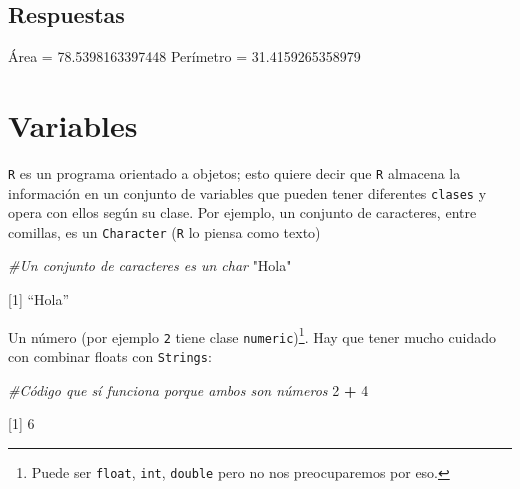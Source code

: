 \documentclass[
]{book}
\newenvironment{Shaded}{\begin{snugshade}}{\end{snugshade}}
\newcommand{\CommentTok}[1]{\textcolor[rgb]{0.56,0.35,0.01}{\textit{#1}}}
\newcommand{\DecValTok}[1]{\textcolor[rgb]{0.00,0.00,0.81}{#1}}
\newcommand{\OperatorTok}[1]{\textcolor[rgb]{0.81,0.36,0.00}{\textbf{#1}}}
\newcommand{\StringTok}[1]{\textcolor[rgb]{0.31,0.60,0.02}{#1}}
\begin{document}
\hypertarget{respuestas}{%
\subsection{Respuestas}\label{respuestas}}

Área = 78.5398163397448
Perímetro = 31.4159265358979

\hypertarget{variables}{%
\section{Variables}\label{variables}}

\texttt{R} es un programa orientado a objetos; esto quiere decir que \texttt{R} almacena la información en un conjunto de variables que pueden tener diferentes \texttt{clases} y opera con ellos según su clase. Por ejemplo, un conjunto de caracteres, entre comillas, es un \texttt{Character} (\texttt{R} lo piensa como texto)

\begin{Shaded}
\begin{Highlighting}[]
\CommentTok{#Un conjunto de caracteres es un char}
\StringTok{"Hola"}
\end{Highlighting}
\end{Shaded}

{[}1{]} ``Hola''

Un número (por ejemplo \texttt{2} tiene clase \texttt{numeric})\footnote{Puede ser \texttt{float}, \texttt{int}, \texttt{double} pero no nos preocuparemos por eso.}. Hay que tener mucho cuidado con combinar floats con \texttt{Strings}:

\begin{Shaded}
\begin{Highlighting}[]
\CommentTok{#Código que sí funciona porque ambos son números}
\DecValTok{2} \OperatorTok{+}\StringTok{ }\DecValTok{4} 
\end{Highlighting}
\end{Shaded}

{[}1{]} 6
\end{document}
